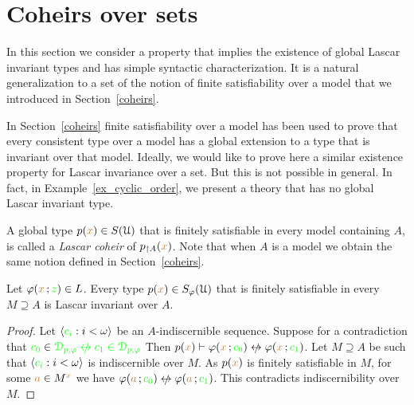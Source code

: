 \section{Coheirs over sets}\label{coheirs_sets}

In this section we consider a property that implies the existence of global Lascar invariant types and has simple syntactic characterization.
It is a natural generalization to a set of the notion of finite satisfiability over a model that we introduced in Section~\ref{coheirs}.

In Section~\ref{coheirs} finite satisfiability over a model has been used to prove that every consistent type over a model has a global extension to a type that is invariant over that model. 
Ideally, we would like to prove here a similar existence property for Lascar invariance over a set.
But this is not possible in general.
In fact, in Example~\ref{ex_cyclic_order}, we present a theory that has no global Lascar invariant type.


\noindent\llap{\textcolor{red}{\Large\warning}\kern1.5ex}%
A global type $p({\color{brown} x})\in S(\EuScript U)$ that is finitely satisfiable in every model containing $A$, is called a \emph{Lascar coheir\/} of $p_{\restriction A}({\color{brown} x})$. 
Note that when $A$ is a model we obtain the same notion defined in Section~\ref{coheirs}.

\begin{proposition} 
  Let $\varphi({\color{brown} x}\,;{\color{green} z})\in L$.
  Every type $p({\color{brown} x})\in S_\varphi(\EuScript U)$ that is finitely satisfiable in every $M\supseteq A$ is Lascar invariant over $A$.
\end{proposition}

\begin{proof}
  Let $\langle{\color{green}c_i}:i<\omega\rangle$ be an $A\mbox{-}$indiscernible sequence.
  Suppose for a contradiction that ${\gr c_0}\in\gr\D_{p,\phi}\niff{\gr c_1}\in\gr\D_{p,\phi}$
  Then $p({\mr x})\proves\phi({\mr x}\,;{\gr c_0})\niff\phi({\mr x}\,;{\gr c_1})$.
  Let $M\supseteq A$ be such that $\langle{\color{green}c_i}:i<\omega\rangle$ is indiscernible over $M$.
  As $p({\color{brown} x})$ is finitely satisfiable in $M$, for some ${\color{brown} a}\in M^{\color{brown} x}$ we have $\phi({\mr a}\,;{\gr c_0})\niff\phi({\mr a}\,;{\gr c_1})$.
  This contradicts indiscernibility over $M$.
\end{proof}

